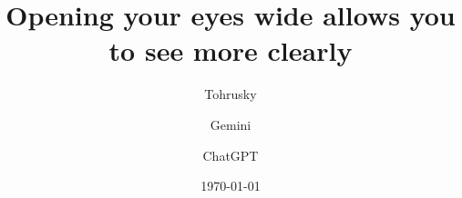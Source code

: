 \documentclass[iclr]{wideopen}
\title{Opening your eyes wide allows you to see more clearly}
\author[1, \ast, \heartsuit]{Tohrusky}
\author[2, \ast]{Gemini}
\author[3, \ast]{ChatGPT}
\affiliation[1]{CloseAI}
\affiliation[2]{Dicksuck}
\affiliation[3]{Gulugulu}
\date{\today}
\begin{document}

\maketitle







{
    \small
    
    
}

\appendix


\end{document}
